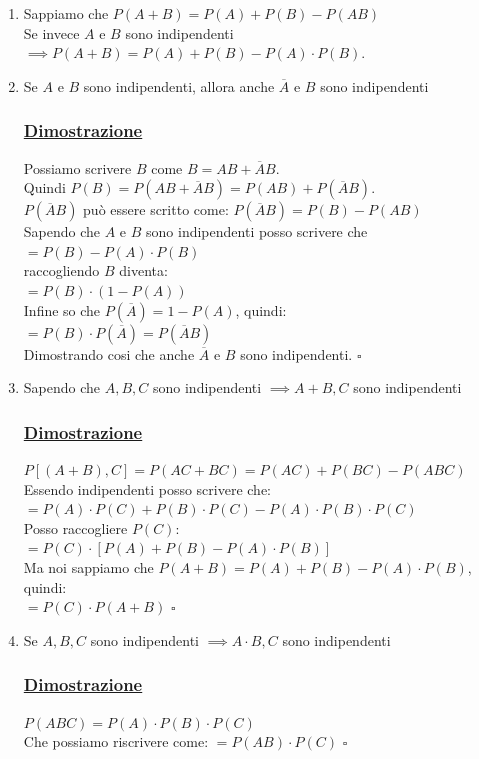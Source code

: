 \documentclass{article}
\begin{document}
\begin{enumerate}
    \item Sappiamo che $P(A+B) = P(A) + P(B) - P(AB)$ \\
    Se invece $A$ e $B$ sono indipendenti $\implies P(A+B)=P(A)+P(B)-P(A)\cdot P(B)$.
    \item Se $A$ e $B$ sono indipendenti, allora anche $\overline{A}$ e $B$ sono indipendenti
    \subsubsection{\underline{Dimostrazione}}
    Possiamo scrivere $B$ come $B = AB + \overline AB$. \\
    Quindi $P(B) = P(AB + \overline AB) = P(AB) + P(\overline AB)$. \\
    $P(\overline AB)$ può essere scritto come: $P(\overline AB) = P(B)-P(AB)$ \\
    Sapendo che $A$ e $B$ sono indipendenti posso scrivere che \\
    $=P(B)-P(A)\cdot P(B)$ \\
    raccogliendo $B$ diventa: \\
    $ = P(B) \cdot \left( 1 - P(A)\right)$ \\
    Infine so che $P(\overline A) = 1 - P(A)$, quindi: \\
    $ = P(B) \cdot  P(\overline A) = P(\overline A B)$ \\
    Dimostrando cosi che anche $\overline{A}$ e $B$ sono indipendenti. 
    \hspace*{0pt}\hfill $\square$ 
    \item Sapendo che $A,B,C$ sono indipendenti $\implies A+B, C $ sono indipendenti 
    \subsubsection{\underline{Dimostrazione}}
    $P[(A+B),C] = P(AC+BC) = P(AC) + P(BC) - P(ABC)$ \\
    Essendo indipendenti posso scrivere che: \\
    $= P(A)\cdot P(C) + P(B)\cdot P(C) - P(A) \cdot P(B) \cdot P(C)$ \\
    Posso raccogliere $P(C)$: \\
    $= P(C) \cdot [P(A) + P(B) - P(A) \cdot P(B)]$ \\
    Ma noi sappiamo che $P(A+B) = P(A) + P(B) - P(A)\cdot P(B)$, quindi: \\
    $= P(C) \cdot P(A+B)$
    \hspace*{0pt}\hfill $\square$
    \item Se $A,B,C $ sono indipendenti $\implies A\cdot B, C $ sono indipendenti
    \subsubsection{\underline{Dimostrazione}}
    $P(ABC) = P(A) \cdot P(B) \cdot P(C)$ \\
    Che possiamo riscrivere come: $= P(AB) \cdot P(C)$
    \hspace*{0pt}\hfill $\square$
\end{enumerate}
\end{document}
